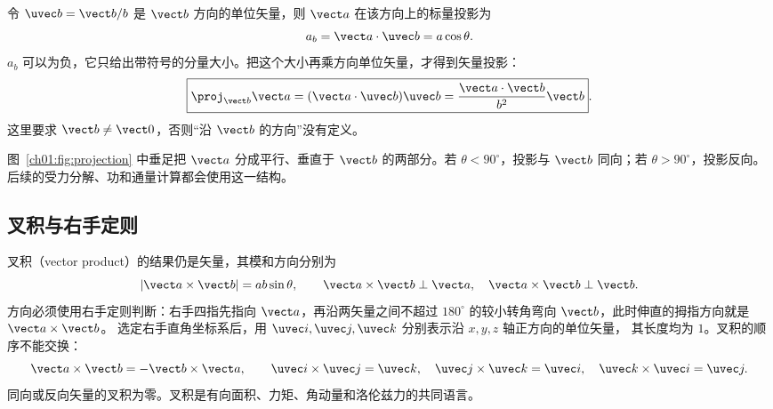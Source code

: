 令 $\uvec b=\vect b/b$ 是 $\vect b$ 方向的单位矢量，则 $\vect a$ 在该方向上的标量投影为
\begin{equation}
 a_b=\vect a\cdot\uvec b=a\cos\theta.
\end{equation}
$a_b$ 可以为负，它只给出带符号的分量大小。把这个大小再乘方向单位矢量，才得到矢量投影：
\begin{equation}
 \boxed{\proj_{\vect b}\vect a
 =(\vect a\cdot\uvec b)\uvec b
 =\frac{\vect a\cdot\vect b}{b^2}\vect b}.
\end{equation}
这里要求 $\vect b\ne\vect 0$，否则“沿 $\vect b$ 的方向”没有定义。

\begin{center}
\label{ch01:fig:projection}
\end{center}
图~\ref{ch01:fig:projection} 中垂足把 $\vect a$ 分成平行、垂直于 $\vect b$ 的两部分。若 $\theta<90^\circ$，投影与 $\vect b$ 同向；若 $\theta>90^\circ$，投影反向。后续的受力分解、功和通量计算都会使用这一结构。

\subsection{叉积与右手定则}

叉积（vector product）的结果仍是矢量，其模和方向分别为
\begin{equation}
 |\vect a\times\vect b|=ab\sin\theta,
 \qquad \vect a\times\vect b\perp\vect a,
 \quad \vect a\times\vect b\perp\vect b.
\end{equation}
方向必须使用右手定则判断：右手四指先指向 $\vect a$，再沿两矢量之间不超过 $180^\circ$ 的较小转角弯向 $\vect b$，此时伸直的拇指方向就是 $\vect a\times\vect b$。
选定右手直角坐标系后，用 $\uvec i,\uvec j,\uvec k$ 分别表示沿 $x,y,z$ 轴正方向的单位矢量，
其长度均为 $1$。叉积的顺序不能交换：
\begin{equation}
 \vect a\times\vect b=-\vect b\times\vect a,
 \qquad
 \uvec i\times\uvec j=\uvec k,
 \quad \uvec j\times\uvec k=\uvec i,
 \quad \uvec k\times\uvec i=\uvec j.
\end{equation}
同向或反向矢量的叉积为零。叉积是有向面积、力矩、角动量和洛伦兹力的共同语言。


